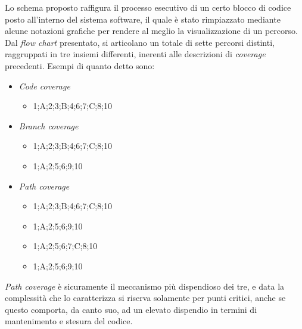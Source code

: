 \documentclass{article}
\begin{document}
Lo schema proposto raffigura il processo esecutivo di un certo blocco di codice posto all'interno del sistema software, il quale è stato rimpiazzato mediante alcune notazioni grafiche per rendere al meglio la visualizzazione di un percorso. Dal \textit{flow chart} presentato, si articolano un totale di sette percorsi distinti, raggruppati in tre insiemi differenti, inerenti alle descrizioni di \textit{coverage} precedenti. Esempi di quanto detto sono:
\begin{itemize}[label={-}]
    \item \textit{Code coverage} 
    \begin{itemize}
        \item 1;A;2;3;B;4;6;7;C;8;10 
    \end{itemize}
    \item \textit{Branch coverage} 
    \begin{itemize}
        \item 1;A;2;3;B;4;6;7;C;8;10
        \item 1;A;2;5;6;9;10
    \end{itemize}
    \item \textit{Path coverage}
    \begin{itemize}
        \item 1;A;2;3;B;4;6;7;C;8;10
        \item 1;A;2;5;6;9;10
        \item 1;A;2;5;6;7;C;8;10
        \item 1;A;2;5;6;9;10
    \end{itemize}                            
\end{itemize}
\textit{Path coverage} è sicuramente il meccanismo più dispendioso dei tre, e data la complessità che lo caratterizza si riserva solamente per punti critici, anche se questo comporta, da canto suo, ad un elevato dispendio in termini di mantenimento e stesura del codice. 
\end{document}
